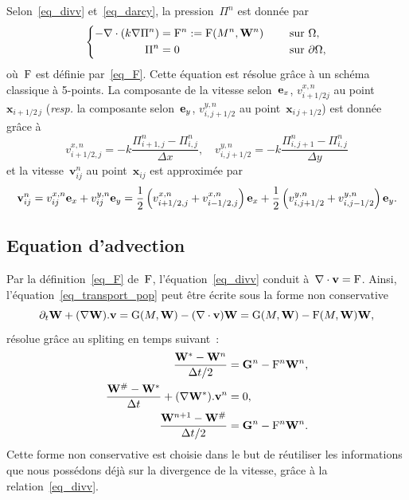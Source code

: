 \documentclass[11pt]{amsart}
\numberwithin{equation}{section}
\newcommand{\W}{{\bf W}}
\newcommand{\Frm}{{\rm F}}
\newcommand{\Grm}{{\rm G}}
\newcommand{\dive}{\nabla\cdot}
\newcommand{\GG}{{\bf G}}
\newcommand{\ex}{{\bf e}_x}
\newcommand{\ey}{{\bf e}_y}
\newcommand{\vit}{\mathbf{v}}
\newcommand{\vecx}{\mathbf{x}}
\begin{document}
Selon~\eqref{eq_divv} et~\eqref{eq_darcy}, 
la pression~$\Pi^n$ est donnée par
\begin{equation}\label{eq_pression_disc}
\left\{
\begin{aligned}
-\dive (k\nabla \Pi^n)&=\Frm^n:=\Frm(M^n,\W^n) & \quad \textrm{ sur } & \Omega , \\
\Pi^n &=0 & \quad \textrm{ sur } & \partial \Omega ,
\end{aligned}
\right.
\end{equation}
où~$\Frm$ est définie par~\eqref{eq_F}. 
Cette équation est résolue grâce à un schéma classique à 5-points. 
La composante de la vitesse selon~$\ex$, $v^{x,n}_{i+1/2 j}$ au point 
$\vecx_{i+1/2\,j}$ ({\it resp.} la composante selon~$\ey$, $v^{y,n}_{i,
  j+1/2}$ au point~${\vecx_{i\,j+1/2}}$) est donnée grâce à
\begin{equation*}
v^{x,n}_{i+1/2,j} = -k \frac{\Pi^n_{i+1,j}-\Pi^n_{i,j}}{\Delta x},\quad
v^{y,n}_{i,j+1/2} = -k \frac{\Pi^n_{i,j+1}-\Pi^n_{i,j}}{\Delta y}
\end{equation*}
et la vitesse~$\vit^n_{ij}$ au point~$\vecx_{ij}$ est approximée par
\begin{align}
  \label{eq_vit_discr}
  \vit^n_{ij}=    v^{x,n}_{ij}\ex
  +v^{y,n}_{ij}\ey=\frac{1}{2}\left(v^{x,n}_{i+1/2,j}
    +v^{x,n}_{i-1/2,j} \right) \ex+\frac{1}{2}\left(v^{y,n}_{i,j+1/2}
    +v^{y,n}_{i,j-1/2} \right) \ey.
\end{align}

\subsection{Equation d'advection}
Par la définition~\eqref{eq_F} de~$\Frm$, l'équation~\eqref{eq_divv} 
conduit à~$\dive\vit=\Frm$. 
Ainsi, l'équation~\eqref{eq_transport_pop} peut être écrite sous la forme non conservative
\begin{equation}\label{eq_non_conservative}
\partial_t \W + (\nabla \W).\vit = \Grm(M,\W)-(\dive \vit)\W = \Grm(M,\W)-\Frm(M,\W)\W,
\end{equation}
résolue grâce au spliting en temps suivant~:
\begin{align}
 \dfrac{\W^*-\W^n}{\Delta t / 2}  &= \GG^n-\Frm^n\W^n, %
 \label{eq_snd_membre} \\
\dfrac{\W^\#-\W^*}{\Delta t} + (\nabla \W^*).\vit^n&= 0,%
 \label{eq_transp_weno}\\
 \dfrac{\W^{n+1}-\W^\#}{\Delta t / 2}  &= \GG^n-\Frm^n\W^n. \label{eq_snd_membre2} 
\end{align}
Cette forme non conservative est choisie dans le but de réutiliser les informations que nous possédons déjà sur la divergence de la vitesse, grâce à la relation~\eqref{eq_divv}.
\end{document}

